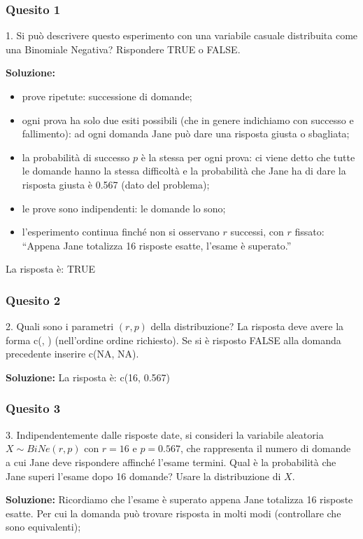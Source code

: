 \documentclass[12pt, a4paper]{article}
\begin{document}
\subsubsection*{Quesito 1}
1. Si può descrivere questo esperimento con una variabile casuale distribuita come una Binomiale Negativa?
Rispondere TRUE o FALSE.

\textbf{Soluzione:}
\begin{itemize}
    \item prove ripetute: successione di domande;
    \item ogni prova ha solo due esiti possibili (che in genere indichiamo con successo e fallimento): ad ogni domanda Jane può dare una risposta giusta o sbagliata;
    \item la probabilità di successo $p$ è la stessa per ogni prova: ci viene detto che tutte le domande hanno la stessa difficoltà e la probabilità che Jane ha di dare la risposta giusta è 0.567 (dato del problema);
    \item le prove sono indipendenti: le domande lo sono;
    \item l’esperimento continua finché non si osservano $r$ successi, con $r$ fissato: ``Appena Jane totalizza 16 risposte esatte, l’esame è superato.''
\end{itemize}
La risposta è: TRUE

\subsubsection*{Quesito 2}
2. Quali sono i parametri $(r,p)$ della distribuzione?
La risposta deve avere la forma c(, ) (nell’ordine ordine richiesto). Se si è risposto FALSE alla domanda precedente inserire c(NA, NA).

\textbf{Soluzione:}
La risposta è: c(16, 0.567)

\subsubsection*{Quesito 3}
3. Indipendentemente dalle risposte date, si consideri la variabile aleatoria $X \sim BiNe(r,p)$ con $r=16$ e $p=0.567$, che rappresenta il numero di domande a cui Jane deve rispondere affinché l’esame termini.
Qual è la probabilità che Jane superi l’esame dopo 16 domande? Usare la distribuzione di $X$.

\textbf{Soluzione:}
Ricordiamo che l’esame è superato appena Jane totalizza 16 risposte esatte. Per cui la domanda può trovare risposta in molti modi (controllare che sono equivalenti);
\end{document}
